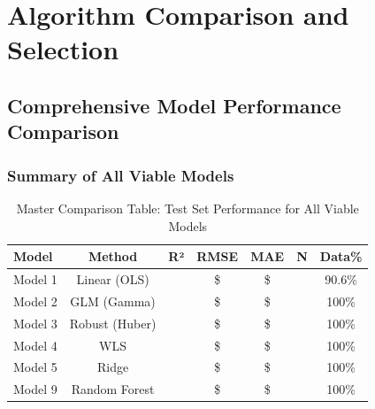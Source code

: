 \chapter{Algorithm Comparison and Selection}  \newpage


\section{Comprehensive Model Performance Comparison}

\subsection{Summary of All Viable Models}

\begin{table}[h!]
\centering
\caption{Master Comparison Table: Test Set Performance for All Viable Models}
\label{tab:master_comparison}
\begin{tabular}{lcccccc}
\toprule
\textbf{Model} & \textbf{Method} & \textbf{R²} & \textbf{RMSE} & \textbf{MAE} & \textbf{N} & \textbf{Data\%} \\
\midrule
Model 1 & Linear (OLS) & \ModelOneRSquaredTest{} & \$\ModelOneRMSETest{} & \$\ModelOneMAETest{} & \ModelOneTestSamples{} & 90.6\% \\
Model 2 & GLM (Gamma) & \ModelTwoRSquaredTest{} & \$\ModelTwoRMSETest{} & \$\ModelTwoMAETest{} & \ModelTwoTestSamples{} & 100\% \\
Model 3 & Robust (Huber) & \ModelThreeRSquaredTest{} & \$\ModelThreeRMSETest{} & \$\ModelThreeMAETest{} & \ModelThreeTestSamples{} & 100\% \\
Model 4 & WLS & \ModelFourRSquaredTest{} & \$\ModelFourRMSETest{} & \$\ModelFourMAETest{} & \ModelFourTestSamples{} & 100\% \\
Model 5 & Ridge & \ModelFiveRSquaredTest{} & \$\ModelFiveRMSETest{} & \$\ModelFiveMAETest{} & \ModelFiveTestSamples{} & 100\% \\
Model 9 & Random Forest & \ModelNineRSquaredTest{} & \$\ModelNineRMSETest{} & \$\ModelNineMAETest{} & \ModelNineTestSamples{} & 100\% \\
\bottomrule
\end{tabular}
\end{table}

